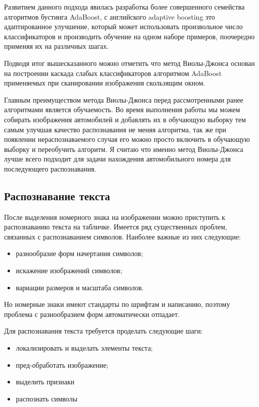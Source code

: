 Развитием данного подхода явилась разработка более совершенного семейства алгоритмов бустинга AdaBoost, с английского adaptive boosting это адаптированное улучшение, который может использовать произвольное число классификаторов и производить обучение на одном наборе примеров, поочередно применяя их на различных шагах.

Подводя итог вышесказанного можно отметить что метод Виолы-Джонса основан на построении каскада слабых классификаторов алгоритмом AdaBoost применяемых при сканировании изображения скользящим окном.

Главным преимуществом метода Виолы-Джонса перед рассмотренными ранее алгоритмами является обучаемость. Во время выполнения работы мы можем собирать изображения автомобилей и добавлять их в обучающую выборку тем самым улучшая качество распознавания не меняя алгоритма, так же при появлении нераспознаваемого случая его можно просто включить в обучающую выборку и переобучить алгоритм. Я считаю что именно метод Виолы-Джонса лучше всего подходит для задачи нахождения автомобильного номера для последующего распознавания.

\subsection{Распознавание текста}
\label{sub:domain:recognition}

После выделения номерного знака на изображении можно приступить к распознаванию текста на табличке. 
Имеется ряд существенных проблем, связанных с распознаванием символов. Наиболее важные из них следующие:
\begin{itemize}
  \item разнообразие форм начертания символов;
  \item искажение изображений символов;
  \item вариации размеров и масштаба символов.
\end{itemize}

Но номерные знаки имеют стандарты по шрифтам и написанию, поэтому проблема с разнообразием форм автоматически отпадает.

Для распознавания текста требуется проделать следующие шаги:
\begin{itemize}
  \item локализировать и выделать элементы текста;
  \item пред-обработать изображение;
  \item выделить признаки
  \item распознать символы
\end{itemize}

